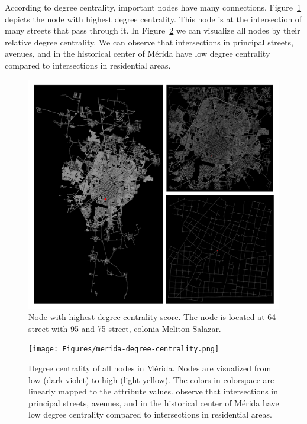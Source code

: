 According to degree centrality, important nodes have many connections.
Figure~\ref{fig:merida-max-node-degree-centrality} depicts the node with highest degree centrality.
This node is at the intersection of many streets that pass through it.
In Figure~\ref{fig:merida-degree-centrality} we can visualize all nodes by their relative degree centrality.
We can observe that intersections in principal streets, avenues, and in the historical center of Mérida have low degree centrality compared to intersections in residential areas.

\begin{figure}[htpb]
  \centering
  \includegraphics[width=1.0\textwidth]{Figures/merida-node-degree-centrality.png}
  \caption{Node with highest degree centrality score. The node is located at 64 street with 95 and 75 street, colonia Meliton Salazar.
    \label{fig:merida-max-node-degree-centrality}}
\end{figure}

\begin{figure}[htpb]
  \centering
  \texttt{[image: Figures/merida-degree-centrality.png]}
  \caption{Degree centrality of all nodes in Mérida. Nodes are visualized from low (dark violet) to high (light yellow). The colors in colorspace are linearly mapped to the attribute values. observe that intersections in principal streets, avenues, and in the historical center of Mérida have low degree centrality compared to intersections in residential areas.
    \label{fig:merida-degree-centrality}}
\end{figure}

